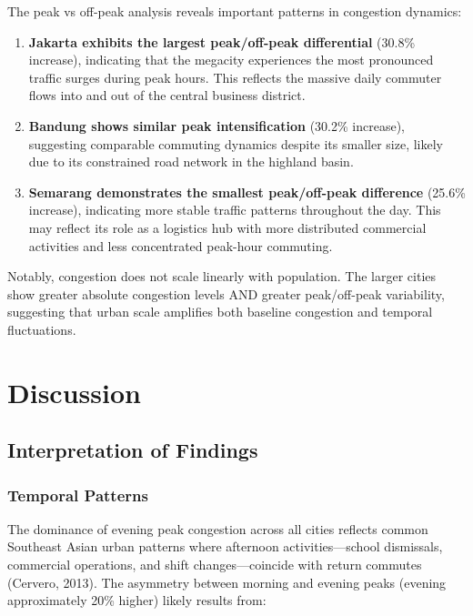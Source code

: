 \documentclass[12pt,a4paper]{article}
\begin{document}
The peak vs off-peak analysis reveals important patterns in congestion dynamics:

\begin{enumerate}
\def\labelenumi{\arabic{enumi}.}
\item
  \textbf{Jakarta exhibits the largest peak/off-peak differential} (30.8\% increase), indicating that the megacity experiences the most pronounced traffic surges during peak hours. This reflects the massive daily commuter flows into and out of the central business district.
\item
  \textbf{Bandung shows similar peak intensification} (30.2\% increase), suggesting comparable commuting dynamics despite its smaller size, likely due to its constrained road network in the highland basin.
\item
  \textbf{Semarang demonstrates the smallest peak/off-peak difference} (25.6\% increase), indicating more stable traffic patterns throughout the day. This may reflect its role as a logistics hub with more distributed commercial activities and less concentrated peak-hour commuting.
\end{enumerate}

Notably, congestion does not scale linearly with population. The larger cities show greater absolute congestion levels AND greater peak/off-peak variability, suggesting that urban scale amplifies both baseline congestion and temporal fluctuations.



\section{Discussion}

\subsection{Interpretation of Findings}

\subsubsection{Temporal Patterns}

The dominance of evening peak congestion across all cities reflects common Southeast Asian urban patterns where afternoon activities---school dismissals, commercial operations, and shift changes---coincide with return commutes (Cervero, 2013). The asymmetry between morning and evening peaks (evening approximately 20\% higher) likely results from:
\end{document}
